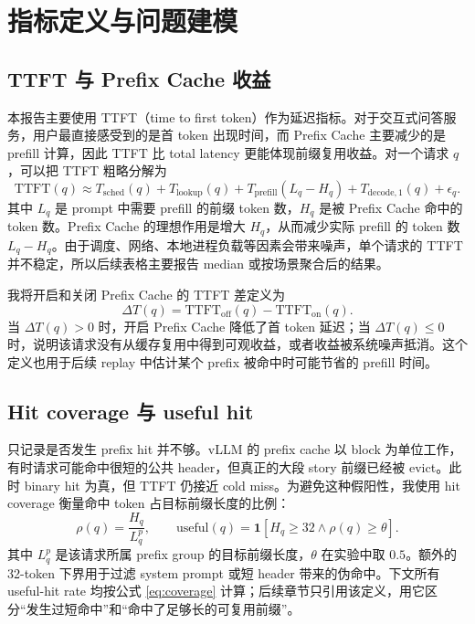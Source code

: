 \documentclass[UTF8,a4paper,10pt]{ctexart}
\newcommand{\TTFT}{\mathrm{TTFT}}
\newcommand{\Saved}{\Delta T}
\begin{document}
\section{指标定义与问题建模}

\subsection{TTFT 与 Prefix Cache 收益}

本报告主要使用 TTFT（time to first token）作为延迟指标。对于交互式问答服务，用户最直接感受到的是首 token 出现时间，而 Prefix Cache 主要减少的是 prefill 计算，因此 TTFT 比 total latency 更能体现前缀复用收益。对一个请求 $q$，可以把 TTFT 粗略分解为
\begin{equation}
\TTFT(q) \approx T_{\mathrm{sched}}(q) + T_{\mathrm{lookup}}(q)
    + T_{\mathrm{prefill}}\!\left(L_q-H_q\right)
    + T_{\mathrm{decode},1}(q) + \epsilon_q .
\label{eq:ttft}
\end{equation}
其中 $L_q$ 是 prompt 中需要 prefill 的前缀 token 数，$H_q$ 是被 Prefix Cache 命中的 token 数。Prefix Cache 的理想作用是增大 $H_q$，从而减少实际 prefill 的 token 数 $L_q-H_q$。由于调度、网络、本地进程负载等因素会带来噪声，单个请求的 TTFT 并不稳定，所以后续表格主要报告 median 或按场景聚合后的结果。

我将开启和关闭 Prefix Cache 的 TTFT 差定义为
\begin{equation}
\Saved(q) = \TTFT_{\mathrm{off}}(q) - \TTFT_{\mathrm{on}}(q).
\label{eq:saved}
\end{equation}
当 $\Saved(q)>0$ 时，开启 Prefix Cache 降低了首 token 延迟；当 $\Saved(q)\le 0$ 时，说明该请求没有从缓存复用中得到可观收益，或者收益被系统噪声抵消。这个定义也用于后续 replay 中估计某个 prefix 被命中时可能节省的 prefill 时间。

\subsection{Hit coverage 与 useful hit}

只记录是否发生 prefix hit 并不够。vLLM 的 prefix cache 以 block 为单位工作，有时请求可能命中很短的公共 header，但真正的大段 story 前缀已经被 evict。此时 binary hit 为真，但 TTFT 仍接近 cold miss。为避免这种假阳性，我使用 hit coverage 衡量命中 token 占目标前缀长度的比例：
\begin{equation}
\rho(q) = \frac{H_q}{L^p_q},
\qquad
\mathrm{useful}(q)=\mathbf{1}\left[H_q \ge 32 \land \rho(q)\ge \theta\right].
\label{eq:coverage}
\end{equation}
其中 $L^p_q$ 是该请求所属 prefix group 的目标前缀长度，$\theta$ 在实验中取 $0.5$。额外的 32-token 下界用于过滤 system prompt 或短 header 带来的伪命中。下文所有 useful-hit rate 均按公式 \ref{eq:coverage} 计算；后续章节只引用该定义，用它区分“发生过短命中”和“命中了足够长的可复用前缀”。
\end{document}
